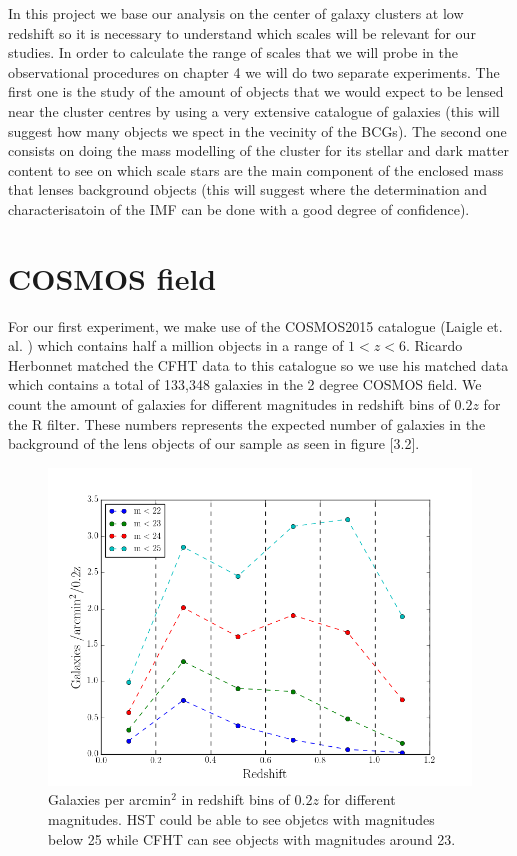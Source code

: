 In this project we base our analysis on the center of galaxy clusters at low redshift so it is necessary to understand which scales will be relevant for our studies. In order to calculate the range of scales that we will probe in the observational procedures on chapter 4 we will do two separate experiments. The first one is the study of the amount of objects that we would expect to be lensed near the cluster centres by using a very extensive catalogue of galaxies (this will suggest how many objects we spect in the vecinity of the BCGs). The second one consists on doing the mass modelling of the cluster for its stellar and dark matter content to see on which scale stars are the main component of the enclosed mass that lenses background objects (this will suggest where the determination and characterisatoin of the IMF can be done with a good degree of confidence).

\section{COSMOS field}

For our first experiment, we make use of the COSMOS2015 catalogue (Laigle et. al. \citeyear{Reference21}) which contains half a million objects in a range of $1<z<6$. Ricardo Herbonnet matched the CFHT data to this catalogue so we use his matched data which contains a total of 133,348 galaxies in the 2 degree COSMOS field. We count the amount of galaxies for different magnitudes in redshift bins of $0.2z$ for the R filter. These numbers represents the expected number of galaxies in the background of the lens objects of our sample as seen in figure [3.2]. 

\begin{figure}[H]
\centering
\includegraphics[width=12cm]{images/galaxies_per_arcmin.png}
\caption[Galaxies per arcmin]{Galaxies per arcmin$^2$ in redshift bins of $0.2z$ for different magnitudes. HST could be able to see objetcs with magnitudes below 25 while CFHT can see objects with magnitudes around 23.}
\end{figure}

